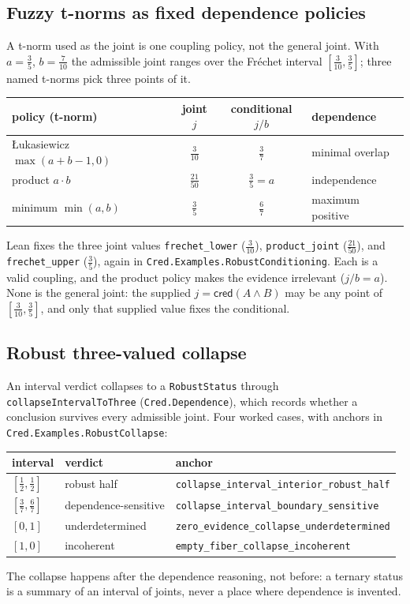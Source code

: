 \documentclass[11pt,a4paper]{article}
\newcommand{\cred}{\mathsf{cred}}
\newcommand{\Lean}[1]{\texttt{#1}}
\begin{document}
\subsection{Fuzzy t-norms as fixed dependence policies}
A t-norm used as the joint is one coupling policy, not the general
joint.  With $a=\tfrac35$, $b=\tfrac{7}{10}$ the admissible joint ranges
over the Fr\'echet interval $[\tfrac{3}{10},\tfrac35]$; three named
t-norms pick three points of it.
\begin{center}
\begin{tabular}{@{}lccl@{}}
\toprule
policy (t-norm) & joint $j$ & conditional $j/b$ & dependence \\
\midrule
\L ukasiewicz $\max(a{+}b{-}1,0)$ & $\tfrac{3}{10}$ & $\tfrac37$ & minimal overlap \\
product $a\cdot b$ & $\tfrac{21}{50}$ & $\tfrac35=a$ & independence \\
minimum $\min(a,b)$ & $\tfrac35$ & $\tfrac67$ & maximum positive \\
\bottomrule
\end{tabular}
\end{center}
Lean fixes the three joint values \Lean{frechet\_lower} ($\tfrac{3}{10}$),
\Lean{product\_joint} ($\tfrac{21}{50}$), and \Lean{frechet\_upper}
($\tfrac35$), again in \texttt{Cred.Examples.RobustConditioning}.
Each is a valid coupling, and the product policy makes the evidence
irrelevant ($j/b=a$).  None is the general joint: the supplied
$j=\cred(A\wedge B)$ may be any point of $[\tfrac{3}{10},\tfrac35]$, and
only that supplied value fixes the conditional.

\subsection{Robust three-valued collapse}
An interval verdict collapses to a \Lean{RobustStatus} through
\Lean{collapseIntervalToThree} (\texttt{Cred.Dependence}), which records
whether a conclusion survives every admissible joint.  Four worked
cases, with anchors in \texttt{Cred.Examples.RobustCollapse}:
\begin{center}
\begin{tabular}{@{}lll@{}}
\toprule
interval & verdict & anchor \\
\midrule
$[\tfrac12,\tfrac12]$ & robust half &
  \Lean{collapse\_interval\_interior\_robust\_half}\\
$[\tfrac37,\tfrac67]$ & dependence-sensitive &
  \Lean{collapse\_interval\_boundary\_sensitive}\\
$[0,1]$ & underdetermined &
  \Lean{zero\_evidence\_collapse\_underdetermined}\\
$[1,0]$ & incoherent &
  \Lean{empty\_fiber\_collapse\_incoherent}\\
\bottomrule
\end{tabular}
\end{center}
The collapse happens after the dependence reasoning, not before: a
ternary status is a summary of an interval of joints, never a place
where dependence is invented.
\end{document}
